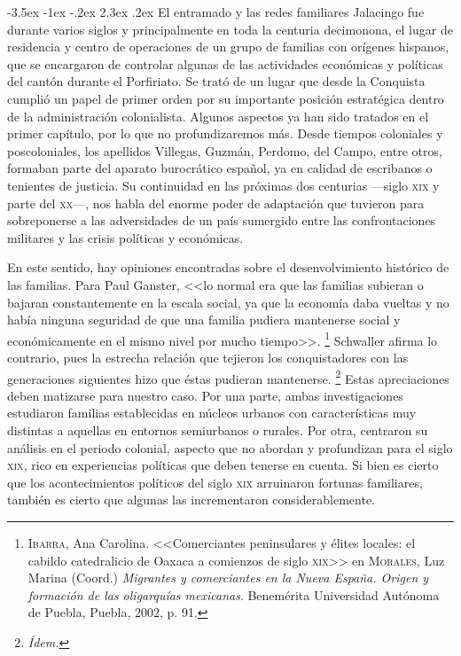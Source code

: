 \documentclass[14pt,twoside,final]{extbook} %
\makeatletter
\let\oldfootnote\footnote
\renewcommand\footnote[1]{%
\oldfootnote{\hspace{1mm}#1}}
\renewcommand\section{\@startsection {section}{1}{\z@}%
                                     {-3.5ex \@plus -1ex \@minus -.2ex}%
                                     {2.3ex \@plus .2ex}%
                                     {\normalfont\large\bfseries\sc}}
\makeatother
\begin{document}
\section{El entramado y las redes familiares}\label{sec:entramado-y-redes-familiares}
Jalacingo fue durante varios siglos y principalmente en toda la centuria decimonona, el lugar de residencia y centro de operaciones de un grupo de familias con orígenes hispanos, que se encargaron de controlar algunas de las actividades económicas y políticas del cantón durante el Porfiriato. Se trató de un lugar que desde la Conquista cumplió un papel de primer orden por su importante posición estratégica dentro de la administración colonialista. Algunos aspectos ya han sido tratados en el primer capítulo, por lo que no profundizaremos más. Desde tiempos coloniales y poscoloniales, los apellidos Villegas, Guzmán, Perdomo, del Campo, entre otros, formaban parte del aparato burocrático español, ya en calidad de escribanos o tenientes de justicia. Su continuidad en las próximas dos centurias ---siglo \textsc{xix} y parte del \textsc{xx}---, nos habla del enorme poder de adaptación que tuvieron para sobreponerse a las adversidades de un país sumergido entre las confrontaciones militares y las crisis políticas y económicas.

En este sentido, hay opiniones encontradas sobre el desenvolvimiento histórico de las familias. Para Paul Ganster, <<lo normal era que las familias subieran o bajaran constantemente en la escala social, ya que la economía daba vueltas y no había ninguna seguridad de que una familia pudiera mantenerse social y económicamente en el mismo nivel por mucho tiempo>>.\footnote{\textsc{Ibarra}, Ana Carolina. <<Comerciantes peninsulares y élites locales: el cabildo catedralicio de Oaxaca a comienzos de siglo \textsc{xix}>> en \textsc{Morales}, Luz Marina (Coord.) \emph{Migrantes y comerciantes en la Nueva España. Origen y formación de las oligarquías mexicanas}. Benemérita Universidad Autónoma de Puebla, Puebla, 2002, p. 91.} Schwaller afirma lo contrario, pues la estrecha relación que tejieron los conquistadores con las generaciones siguientes hizo que éstas pudieran mantenerse.\footnote{\em Ídem.} Estas apreciaciones deben matizarse para nuestro caso. Por una parte, ambas investigaciones estudiaron familias establecidas en núcleos urbanos con características muy distintas a aquellas en entornos semiurbanos o rurales. Por otra, centraron su análisis en el periodo colonial, aspecto que no abordan y profundizan para el siglo \textsc{xix}, rico en experiencias políticas que deben tenerse en cuenta. Si bien es cierto que los acontecimientos políticos del siglo \textsc{xix} arruinaron fortunas familiares, también es cierto que algunas las incrementaron considerablemente.
\end{document}
